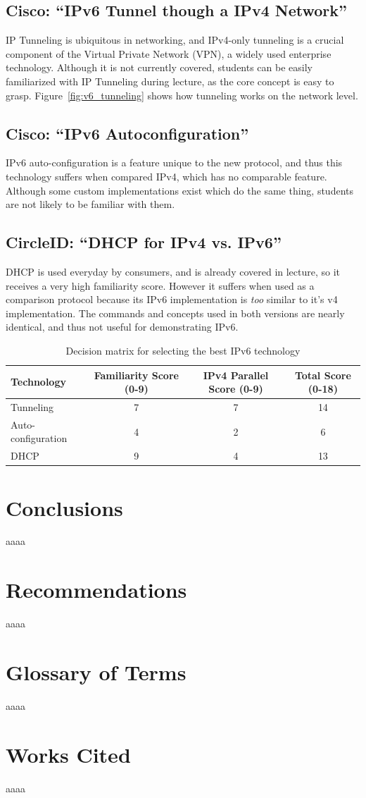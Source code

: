 \documentclass[12pt]{article}
\begin{document}
\subsection{Cisco: ``IPv6 Tunnel though a IPv4 Network''}
IP Tunneling is ubiquitous in networking, and IPv4-only tunneling is a crucial component of the Virtual Private Network (VPN), a widely used enterprise technology. Although it is not currently covered, students can be easily familiarized with IP Tunneling during lecture, as the core concept is easy to grasp. Figure~\ref{fig:v6_tunneling} shows how tunneling works on the network level.

\subsection{Cisco: ``IPv6 Autoconfiguration''}
IPv6 auto-configuration is a feature unique to the new protocol, and thus this technology suffers when compared IPv4, which has no comparable feature. Although some custom implementations exist which do the same thing, students are not likely to be familiar with them.

\subsection{CircleID: ``DHCP for IPv4 vs. IPv6''}
DHCP is used everyday by consumers, and is already covered in lecture, so it receives a very high familiarity score. However it suffers when used as a comparison protocol because its IPv6 implementation is \textit{too} similar to it's v4 implementation. The commands and concepts used in both versions are nearly identical, and thus not useful for demonstrating IPv6.

\medskip
\begin{table}[h!]
  \centering
  \label{table:dec_matrix}
  \begin{tabulary}{\textwidth}{|L|C|C|C|}
    \hline
    Technology & Familiarity Score (0-9) & IPv4 Parallel Score (0-9) & Total Score (0-18) \\ \hline\hline
    Tunneling          & 7 & 7 & 14 \\ \hline
    Auto-configuration & 4 & 2 & 6 \\ \hline
    DHCP               & 9 & 4 & 13 \\ \hline
    \hline
  \end{tabulary}
  \caption{Decision matrix for selecting the best IPv6 technology}
\end{table}

\section{Conclusions}
aaaa

\section{Recommendations}
aaaa

\section{Glossary of Terms}
aaaa

\section{Works Cited}
aaaa
\end{document}
